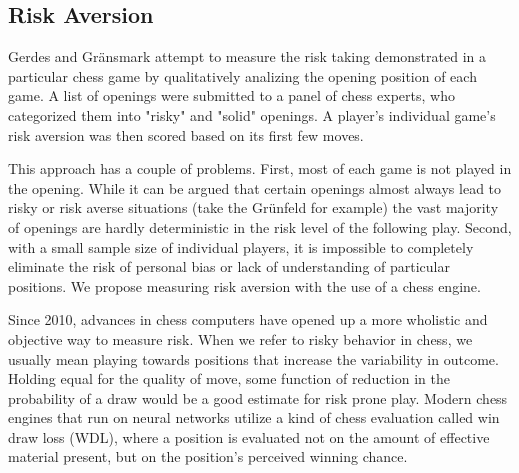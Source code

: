 \documentclass[letterpaper, 11pt]{article}
\begin{document}
    \subsection*{Risk Aversion}
        Gerdes and Gränsmark attempt to measure the risk taking demonstrated in a particular chess game by qualitatively analizing the opening position of each game.
        A list of openings were submitted to a panel of chess experts, who categorized them into "risky" and "solid" openings.
        A player's individual game's risk aversion was then scored based on its first few moves.

        This approach has a couple of problems. 
        First, most of each game is not played in the opening.
        While it can be argued that certain openings almost always lead to risky or risk averse situations (take the Grünfeld for example) the vast majority of openings are hardly deterministic in the risk level of the following play.
        Second, with a small sample size of individual players, it is impossible to completely eliminate the risk of personal bias or lack of understanding of particular positions. We propose measuring risk aversion with the use of a chess engine.

        Since 2010, advances in chess computers have opened up a more wholistic and objective way to measure risk.
        When we refer to risky behavior in chess, we usually mean playing towards positions that increase the variability in outcome.
        Holding equal for the quality of move, some function of reduction in the probability of a draw would be a good estimate for risk prone play.
        Modern chess engines that run on neural networks utilize a kind of chess evaluation called win draw loss (WDL), where a position is evaluated not on the amount of effective material present, but on the position's perceived winning chance.
\end{document}
